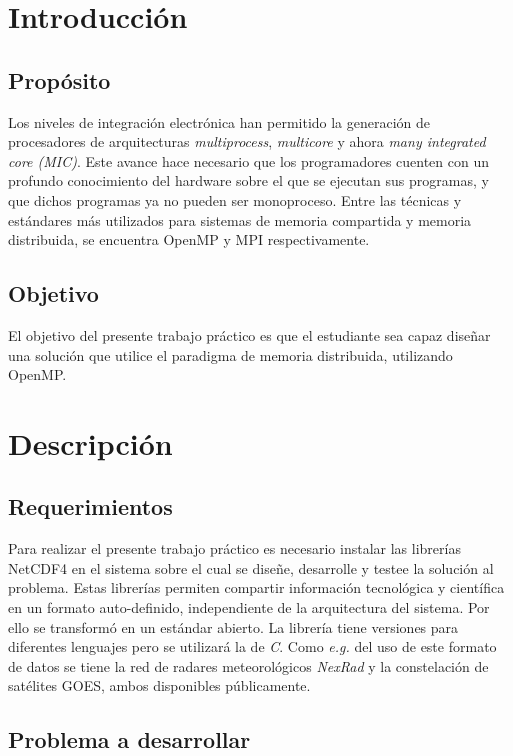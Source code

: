 \documentclass[a4paper]{article}
\begin{document}
\clearpage

\section{Introducción}
\subsection{Propósito}
Los niveles de integración electrónica han permitido la generación de procesadores de arquitecturas \textit{multiprocess}, \textit{multicore} y ahora \textit{many integrated core (MIC)}. Este avance hace necesario que los programadores cuenten con un profundo conocimiento del hardware sobre el que se ejecutan sus programas, y que dichos programas ya no pueden ser monoproceso.
Entre las técnicas y estándares más utilizados para sistemas de memoria compartida y memoria distribuida, se encuentra OpenMP y MPI respectivamente.

\subsection{Objetivo}

El objetivo del presente trabajo práctico es que el estudiante sea capaz diseñar una solución que utilice el paradigma de memoria distribuida, utilizando OpenMP.

\section{Descripción}

\subsection{Requerimientos}
Para realizar el presente trabajo práctico es necesario instalar las librerías NetCDF4 en el sistema sobre el cual se diseñe, desarrolle y testee la solución al problema.
Estas librerías permiten compartir información tecnológica y científica en un formato auto-definido, independiente de la arquitectura del sistema. Por ello se transformó en un estándar abierto.
La librería tiene versiones para diferentes lenguajes pero se utilizará la de \textit{C}.
Como \textit{e.g.} del uso de este formato de datos se tiene la red de radares meteorológicos \textit{NexRad} y la constelación de satélites GOES, ambos disponibles públicamente. 

\subsection{Problema a desarrollar}
\end{document}
